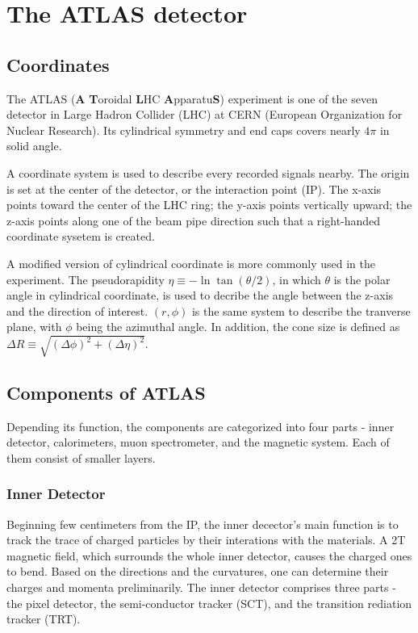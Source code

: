 \documentclass[class=NCU_thesis, crop=false]{standalone}
\begin{document}
\chapter{The ATLAS detector}
\section{Coordinates}
	The ATLAS (\textbf{A} \textbf{T}oroidal \textbf{L}HC \textbf{A}pparatu\textbf{S}) experiment is one of the seven detector in Large Hadron Collider (LHC) at CERN (European Organization for Nuclear Research). Its cylindrical symmetry and end caps covers nearly $4\pi$ in solid angle.
	
	A coordinate system is used to describe every recorded signals nearby. The origin is set at the center of the detector, or the interaction point (IP). The x-axis points toward the center of the LHC ring; the y-axis points vertically upward; the z-axis points along one of the beam pipe direction such that a right-handed coordinate sysetem is created.
	
	A modified version of cylindrical coordinate is more commonly used in the experiment. The pseudorapidity $\eta \equiv -\ln\tan(\theta / 2)$, in which $\theta$ is the polar angle in cylindrical coordinate, is used to decribe the angle between the z-axis and the direction of interest. $(r, \phi)$ is the same system to describe the tranverse plane, with $\phi$ being the azimuthal angle. In addition, the cone size is defined as $\Delta R \equiv \sqrt{(\Delta \phi)^2 + (\Delta \eta)^2}$.

\section{Components of ATLAS}
	Depending its function, the components are categorized into four parts - inner detector, calorimeters, muon spectrometer, and the magnetic system. Each of them consist of smaller layers.
	
	\subsection{Inner Detector}
		Beginning few centimeters from the IP, the inner decector's main function is to track the trace of charged particles by their interations with the materials. A 2T magnetic field, which surrounds the whole inner detector, causes the charged ones to bend. Based on the directions and the curvatures, one can determine their charges and momenta preliminarily. The inner detector comprises three parts - the pixel detector, the semi-conductor tracker (SCT), and the transition rediation tracker (TRT).
		
\end{document}
